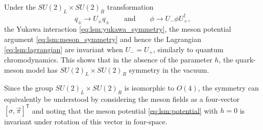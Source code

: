 Under the $SU(2)_L \times SU(2)_R$ transformation 
\begin{equation}
	q_\pm \rightarrow U_\pm q_\pm
	\qquad \text{and} \qquad
	\phi   \rightarrow U_- \phi U_+^\dagger,
\label{eq:lsm:symmetry_transformation}
\end{equation}
the Yukawa interaction \eqref{eq:lsm:yukawa_symmetry},
the meson potential argument \eqref{eq:lsm:meson_symmetry}
and hence the Lagrangian \eqref{eq:lsm:lagrangian} are invariant when $U_-=U_+$,
similarly to quantum chromodynamics.
This shows that in the absence of the parameter $h$,
the quark-meson model has $SU(2)_L \times SU(2)_R$ symmetry in the vacuum.

Since the group $SU(2)_L \times SU(2)_R$ is isomorphic to $O(4)$,
the symmetry can equivalently be understood by considering the meson fields as a four-vector $[\sigma, \vec{\pi}]^\mathsf{T}$
and noting that the meson potential \eqref{eq:lsm:potential} with $h=0$ is invariant under rotation of this vector in four-space.

